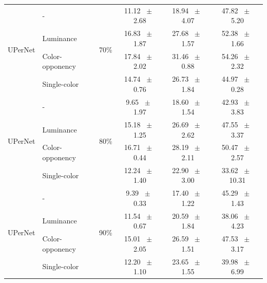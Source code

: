 \begin{table}[h]
\begin{tabular}{@{}l l c c c c@{}}
    \multirow{4}{*}{UPerNet} & - & \multirow{4}{*}{70\%} & 11.12 ~$\pm$~ 2.68 & 18.94 ~$\pm$~ 4.07 & 47.82 ~$\pm$~ 5.20 \\
    & Luminance &  & 16.83 ~$\pm$~ 1.87 & 27.68 ~$\pm$~ 1.57 & 52.38 ~$\pm$~ 1.66 \\
    & Color-opponency &  & 17.84 ~$\pm$~ 2.02 & 31.46 ~$\pm$~ 0.88 & 54.26 ~$\pm$~ 2.32 \\
    & Single-color &  & 14.74 ~$\pm$~ 0.76 & 26.73 ~$\pm$~ 1.84 & 44.97 ~$\pm$~ 0.28 \\
    \midrule
    \multirow{4}{*}{UPerNet} & - & \multirow{4}{*}{80\%} & 9.65 ~$\pm$~ 1.97 & 18.60 ~$\pm$~ 1.54 & 42.93 ~$\pm$~ 3.83 \\
    & Luminance &  & 15.18 ~$\pm$~ 1.25 & 26.69 ~$\pm$~ 2.62 & 47.55 ~$\pm$~ 3.37 \\
    & Color-opponency &  & 16.71 ~$\pm$~ 0.44 & 28.19 ~$\pm$~ 2.11 & 50.47 ~$\pm$~ 2.57 \\
    & Single-color &  & 12.24 ~$\pm$~ 1.40 & 22.90 ~$\pm$~ 3.00 & 33.62 ~$\pm$~ 10.31 \\
    \midrule
    \multirow{4}{*}{UPerNet} & - & \multirow{4}{*}{90\%} & 9.39 ~$\pm$~ 0.33 & 17.40 ~$\pm$~ 1.22 & 45.29 ~$\pm$~ 1.43 \\
    & Luminance &  & 11.54 ~$\pm$~ 0.67 & 20.59 ~$\pm$~ 1.84 & 38.06 ~$\pm$~ 4.23 \\
    & Color-opponency &  & 15.01 ~$\pm$~ 2.05 & 26.59 ~$\pm$~ 1.51 & 47.53 ~$\pm$~ 3.17 \\
    & Single-color &  & 12.20 ~$\pm$~ 1.10 & 23.65 ~$\pm$~ 1.55 & 39.98 ~$\pm$~ 6.99 \\
    \midrule
    \bottomrule
  \end{tabular}
  \label{tab:upernet_dark_zurich}
\end{table}